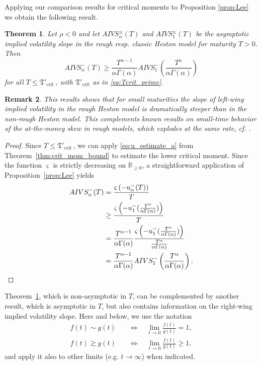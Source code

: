 \documentclass[12pt,a4paper]{amsart}
\numberwithin{equation}{section}
\numberwithin{equation}{section}
\newtheorem{theorem}{Theorem}[section]
\newtheorem{remark}[theorem]{Remark}
\theoremstyle{nonumberplain}
\newcommand{\RR}{\mathbb{R}}
\begin{document}
Applying our comparison results for critical moments to Proposition \ref{prop:Lee} we obtain the following result.
\begin{theorem}\label{thm:implied_vola_bound}
	Let $\rho < 0$ and let $AIVS_{\alpha}^\pm (T)$ and $AIVS_{1}^\pm(T)$ be the asymptotic implied volatility slope in the rough resp. classic Heston model for maturity $T>0$. Then
	\begin{equation*}
		AIVS_{\alpha}^- (T) \ge \frac{T^{\alpha -1}}{\alpha \Gamma(\alpha )} AIVS_1^-\left(\frac{T^{\alpha}}{\alpha \Gamma(\alpha)}\right)
	\end{equation*}
	for all $T \le \mathfrak{T}'_\text{crit}\,$, with $\mathfrak{T}'_\text{crit}$ as in \eqref{eq:Tcrit_prime}.
\end{theorem}
\begin{remark}
This results shows that for small maturities the slope of left-wing implied volatility in the rough Heston model is dramatically steeper than in the non-rough Heston model. This complements known results on small-time behavior of the at-the-money skew in rough models, which explodes at the same rate, cf. \cite{fukasawa2017short}. 
\end{remark}
\begin{proof} Since $T \le \mathfrak{T}'_\text{crit}\,$, we can apply \eqref{eq:u_estimate_a} from Theorem~\ref{thm:crit_mom_bound} to estimate the lower critical moment. Since the function $\varsigma$ is strictly decreasing on $\RR_{ \ge 0}$, a straightforward application of Proposition~\ref{prop:Lee} yields
	\begin{align*}
		AIVS_{\alpha}^-(T) &= \frac{\varsigma \left(- u_{\alpha}^-(T) \right)}{T} \\
		&\ge \frac{\varsigma \left(- u_{1}^-(\frac{T^{\alpha}}{\alpha \Gamma(\alpha)}) \right)}{T} \\
		&= \frac{T^{\alpha -1}}{\alpha \Gamma(\alpha )} \frac{\varsigma \left(- u_{1}^-(\frac{T^{\alpha}}{\alpha \Gamma(\alpha)}) \right)}{\frac{T^{\alpha}}{\alpha \Gamma(\alpha)}} \\
		&= \frac{T^{\alpha -1}}{\alpha \Gamma(\alpha )} AIVS_1^-\left(\frac{T^{\alpha}}{\alpha \Gamma(\alpha)} \right). \qedhere
	\end{align*}
\end{proof}
Theorem~\ref{thm:implied_vola_bound}, which is non-asymptotic in $T$, can be complemented by another result, which is asymptotic in $T$, but also contains information on the right-wing implied volatility slope. Here and below, we use the notation
\begin{align*}
f(t) \sim g(t) \quad &\Longleftrightarrow \quad \lim_{t \to 0} \frac{f(t)}{g(t)} = 1,\\
f(t) \gtrsim g(t) \quad &\Longleftrightarrow \quad \lim_{t \to 0} \frac{f(t)}{g(t)} \ge 1,
\end{align*}
and apply it also to other limits (e.g. $t \to \infty$) when indicated.
\end{document}
